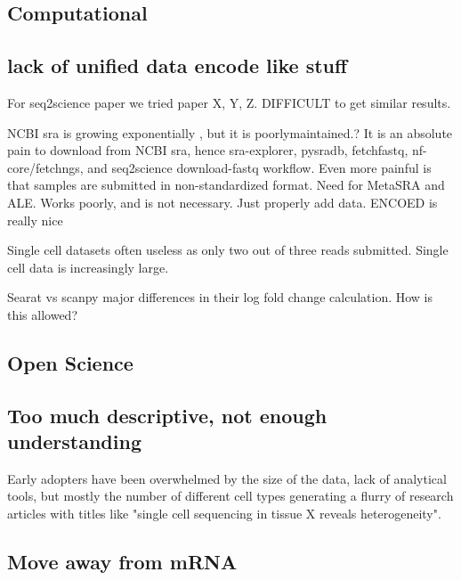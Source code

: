 \subsection{Computational}

\subsection{lack of unified data encode like stuff}

For seq2science paper we tried paper X, Y, Z. DIFFICULT to get similar results.     

% 

NCBI sra is growing exponentially \cite{srawebsite}, but it is poorlymaintained.? It is an absolute pain to download from NCBI sra, hence sra-explorer, pysradb, fetchfastq, nf-core/fetchngs, and seq2science download-fastq workflow. Even more painful is that samples are submitted in non-standardized format. Need for MetaSRA and ALE. Works poorly, and is not necessary. Just properly add data. ENCOED is really nice

Single cell datasets often useless as only two out of three reads submitted. Single cell data is increasingly large.

Searat vs scanpy major differences in their log fold change calculation. How is this allowed?

\subsection{Open Science}



\subsection{Too much descriptive, not enough understanding}

Early adopters have been overwhelmed by the size of the data, lack of analytical tools, but mostly the number of different cell types generating a flurry of research articles with titles like "single cell sequencing in tissue X reveals heterogeneity".  

\subsection{Move away from mRNA}

